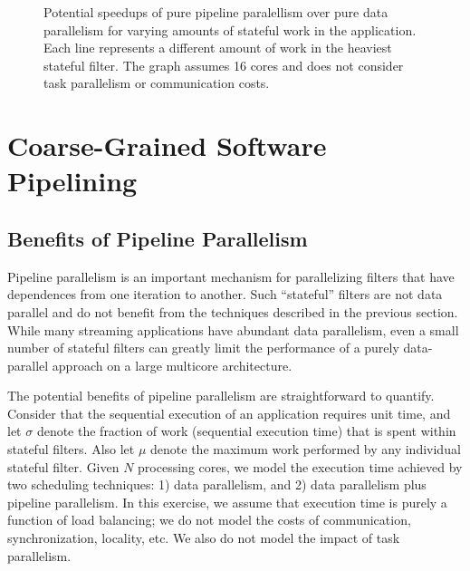 \begin{figure}[t]
\begin{center}
\end{center}
\caption{Potential speedups of pure pipeline paralellism over pure
data parallelism for varying amounts of stateful work in the
application.  Each line represents a different amount of work in the
heaviest stateful filter.  The graph assumes 16 cores and does not
consider task parallelism or communication costs.
\protect\label{fig:model-speedup}}
\end{figure}

\section{Coarse-Grained Software Pipelining}
\label{sec:softpipe}

\subsection{Benefits of Pipeline Parallelism}
\label{sec:pipeline-model}

Pipeline parallelism is an important mechanism for parallelizing
filters that have dependences from one iteration to another.  Such
``stateful'' filters are not data parallel and do not benefit from the
techniques described in the previous section.  While many streaming
applications have abundant data parallelism, even a small number of
stateful filters can greatly limit the performance of a purely
data-parallel approach on a large multicore architecture.

The potential benefits of pipeline parallelism are straightforward to
quantify.  Consider that the sequential execution of an application
requires unit time, and let $\sigma$ denote the fraction of work
(sequential execution time) that is spent within stateful filters.
Also let $\mu$ denote the maximum work performed by any individual
stateful filter.  Given $N$ processing cores, we model the execution
time achieved by two scheduling techniques: 1) data parallelism, and
2) data parallelism plus pipeline parallelism.  In this exercise, we
assume that execution time is purely a function of load balancing; we
do not model the costs of communication, synchronization, locality,
etc.  We also do not model the impact of task parallelism.

